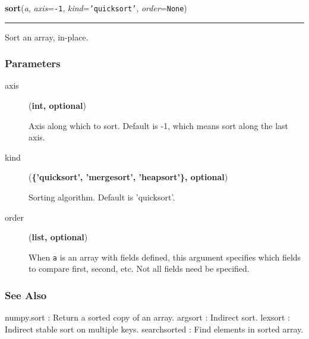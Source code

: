     \begin{boxedminipage}{\textwidth}

    \raggedright \textbf{sort}(\textit{a}, \textit{axis}=\texttt{-1}, \textit{kind}=\texttt{'quicksort'}, \textit{order}=\texttt{None})

    \vspace{-1.5ex}

    \rule{\textwidth}{0.5\fboxrule}

Sort an array, in-place.



\hypertarget{parameters}{}
\subsubsection*{Parameters}
\begin{description}
\item[{axis}] (\textbf{int, optional})

Axis along which to sort. Default is -1, which means sort along the
last axis.

\item[{kind}] (\textbf{{\{}'quicksort', 'mergesort', 'heapsort'{\}}, optional})

Sorting algorithm. Default is 'quicksort'.

\item[{order}] (\textbf{list, optional})

When \texttt{a} is an array with fields defined, this argument specifies
which fields to compare first, second, etc.  Not all fields need be
specified.

\end{description}



\hypertarget{see-also}{}
\subsubsection*{See Also}

numpy.sort : Return a sorted copy of an array.
argsort : Indirect sort.
lexsort : Indirect stable sort on multiple keys.
searchsorted : Find elements in sorted array.



\end{boxedminipage}
